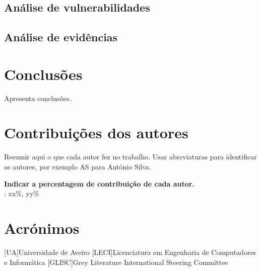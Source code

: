 \documentclass{report}
\begin{document}
\section{Análise de vulnerabilidades}
\section{Análise de evidências}

\chapter{Conclusões}
\label{chap.conclusao}
Apresenta conclusões.

\chapter*{Contribuições dos autores}
Resumir aqui o que cada autor fez no trabalho.
Usar abreviaturas para identificar os autores,
por exemplo AS para António Silva.

\vspace{10pt}
\textbf{Indicar a percentagem de contribuição de cada autor.}\\

\autoresacronimos : xx\%, yy\%\\


\chapter*{Acrónimos}
\begin{acronym}
[UA]{Universidade de Aveiro}
[LECI]{Licenciatura em Engenharia de Computadores e Informática}
[GLISC]{Grey Literature International Steering Committee}
\end{acronym}


\printbibliography
\end{document}
